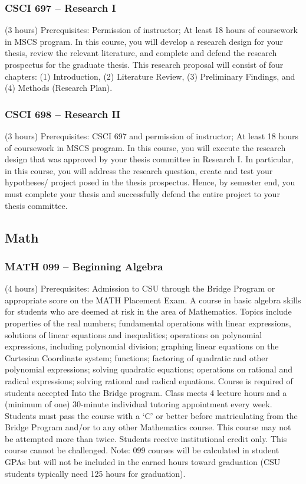 \subsubsection{CSCI 697 -- Research I}
(3 hours) Prerequisites: Permission of instructor; At least 18 hours of coursework in MSCS program.   In this course, you will develop a research design for your thesis, review the relevant literature, and complete and defend the research prospectus for the graduate thesis. This research proposal will consist of four chapters: (1) Introduction, (2) Literature Review, (3) Preliminary Findings, and (4) Methods (Research Plan). 

\subsubsection{CSCI 698 -- Research II}
(3 hours) Prerequisites: CSCI 697 and permission of instructor; At least 18 hours of coursework in MSCS program. In this course, you will execute the research design that was approved by your thesis committee in Research I. In particular, in this course, you will address the research question, create and test your hypotheses/ project posed in the thesis prospectus. Hence, by semester end, you must complete your thesis and successfully defend the entire project to your thesis committee. 

\subsection{Math}

\subsubsection{MATH 099 -- Beginning Algebra}
(4 hours) Prerequisites: Admission to CSU through the Bridge Program or appropriate score on the MATH Placement Exam. A course in basic algebra skills for students who are deemed at risk in the area of Mathematics. Topics include properties of the real numbers; fundamental operations with linear expressions, solutions of linear equations and inequalities; operations on polynomial expressions, including polynomial division; graphing linear equations on the Cartesian Coordinate system; functions; factoring of quadratic and other polynomial expressions; solving quadratic equations; operations on rational and radical expressions; solving rational and radical equations. Course is required of students accepted Into the Bridge program. Class meets 4 lecture hours and a (minimum of one) 30-minute individual tutoring appointment every week. Students must pass the course with a ‘C’ or better before matriculating from the Bridge Program and/or to any other Mathematics course. This course may not be attempted more than twice. Students receive institutional credit only. This course cannot be challenged. Note: 099 courses will be calculated in student GPAs but will not be included in the earned hours toward graduation (CSU students typically need 125 hours for graduation).

